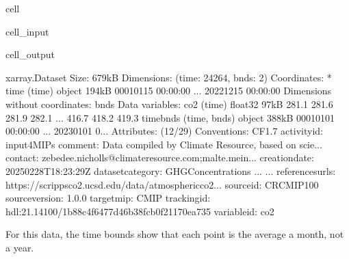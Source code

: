 \documentclass[letterpaper,10pt,english]{jupyterBook}
\begin{document}
\begin{sphinxuseclass}{cell}\begin{sphinxVerbatimInput}

\begin{sphinxuseclass}{cell_input}
\begin{sphinxVerbatim}[commandchars=\\\{\}]
\end{sphinxVerbatim}

\end{sphinxuseclass}\end{sphinxVerbatimInput}
\begin{sphinxVerbatimOutput}

\begin{sphinxuseclass}{cell_output}
\begin{sphinxVerbatim}[commandchars=\\\{\}]
\PYGZlt{}xarray.Dataset\PYGZgt{} Size: 679kB
Dimensions:    (time: 24264, bnds: 2)
Coordinates:
  * time       (time) object 194kB 0001\PYGZhy{}01\PYGZhy{}15 00:00:00 ... 2022\PYGZhy{}12\PYGZhy{}15 00:00:00
Dimensions without coordinates: bnds
Data variables:
    co2        (time) float32 97kB 281.1 281.6 281.9 282.1 ... 416.7 418.2 419.3
    time\PYGZus{}bnds  (time, bnds) object 388kB 0001\PYGZhy{}01\PYGZhy{}01 00:00:00 ... 2023\PYGZhy{}01\PYGZhy{}01 0...
Attributes: (12/29)
    Conventions:             CF\PYGZhy{}1.7
    activity\PYGZus{}id:             input4MIPs
    comment:                 Data compiled by Climate Resource, based on scie...
    contact:                 zebedee.nicholls@climate\PYGZhy{}resource.com;malte.mein...
    creation\PYGZus{}date:           2025\PYGZhy{}02\PYGZhy{}28T18:23:29Z
    dataset\PYGZus{}category:        GHGConcentrations
    ...                      ...
    references\PYGZus{}urls:         https://scrippsco2.ucsd.edu/data/atmospheric\PYGZus{}co2...
    source\PYGZus{}id:               CR\PYGZhy{}CMIP\PYGZhy{}1\PYGZhy{}0\PYGZhy{}0
    source\PYGZus{}version:          1.0.0
    target\PYGZus{}mip:              CMIP
    tracking\PYGZus{}id:             hdl:21.14100/1b88c4f6\PYGZhy{}477d\PYGZhy{}46b3\PYGZhy{}8fcb\PYGZhy{}0f21170ea735
    variable\PYGZus{}id:             co2
\end{sphinxVerbatim}

\end{sphinxuseclass}\end{sphinxVerbatimOutput}

\end{sphinxuseclass}
\sphinxAtStartPar
For this data, the time bounds show that each point
is the average a month, not a year.
\end{document}

